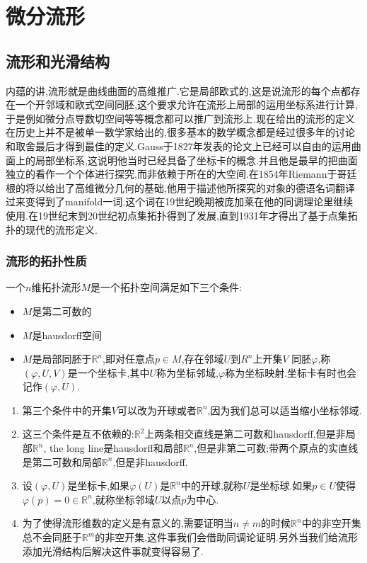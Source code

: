 \chapter{微分流形}
\section{流形和光滑结构}

内蕴的讲,流形就是曲线曲面的高维推广.它是局部欧式的,这是说流形的每个点都存在一个开邻域和欧式空间同胚,这个要求允许在流形上局部的运用坐标系进行计算,于是例如微分点导数切空间等等概念都可以推广到流形上.现在给出的流形的定义在历史上并不是被单一数学家给出的,很多基本的数学概念都是经过很多年的讨论和取舍最后才得到最佳的定义.Gauss于1827年发表的论文上已经可以自由的运用曲面上的局部坐标系,这说明他当时已经具备了坐标卡的概念.并且他是最早的把曲面独立的看作一个个体进行探究,而非依赖于所在的大空间.在1854年Riemann于哥廷根的将以给出了高维微分几何的基础,他用于描述他所探究的对象的德语名词翻译过来变得到了manifold一词.这个词在19世纪晚期被庞加莱在他的同调理论里继续使用.在19世纪末到20世纪初点集拓扑得到了发展,直到1931年才得出了基于点集拓扑的现代的流形定义.

\subsection{流形的拓扑性质}

一个$n$维拓扑流形$M$是一个拓扑空间满足如下三个条件:
\begin{itemize}
  \item $M$是第二可数的
  \item $M$是hausdorff空间
  \item $M$是局部同胚于$\mathbb{R}^n$,即对任意点$p\in M$,存在邻域$U$到$R^n$上开集$V$
  同胚$\varphi$,称$(\varphi,U,V)$是一个坐标卡,其中$U$称为坐标邻域,$\varphi$称为坐标映射.坐标卡有时也会记作$(\varphi,U)$.
\end{itemize}
\begin{enumerate}
	\item 第三个条件中的开集$V$可以改为开球或者$\mathbb{R}^n$,因为我们总可以适当缩小坐标邻域.
	\item 这三个条件是互不依赖的:$\mathbb{R}^2$上两条相交直线是第二可数和hausdorff,但是非局部$\mathbb{R}^n$,
	the long line是hausdorff和局部$\mathbb{R}^n$,但是非第二可数;带两个原点的实直线是第二可数和局部$\mathbb{R}^n$,但是非hausdorff.
	\item 设$(\varphi,U)$是坐标卡,如果$\varphi(U)$是$\mathbb{R}^n$中的开球,就称$U$是坐标球.如果$p\in U$使得$\varphi(p)=0\in\mathbb{R}^n$,就称坐标邻域$U$以点$p$为中心.
	\item 为了使得流形维数的定义是有意义的,需要证明当$n\not=m$的时候$\mathbb{R}^n$中的非空开集总不会同胚于$\mathbb{R}^m$的非空开集,这件事我们会借助同调论证明.另外当我们给流形添加光滑结构后解决这件事就变得容易了.
\end{enumerate}

